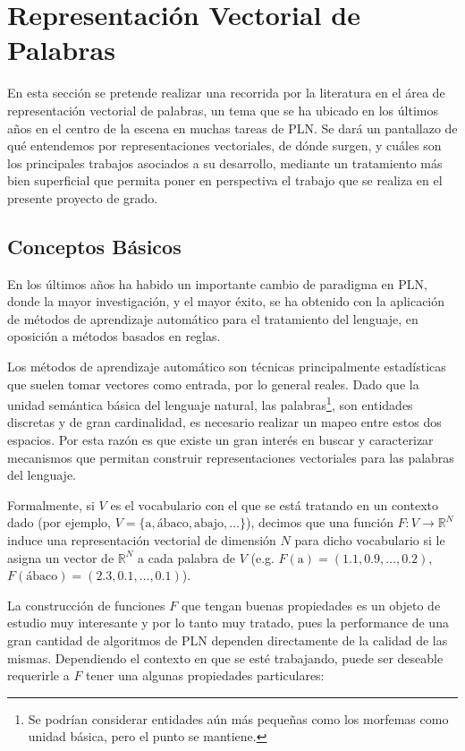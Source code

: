 \chapter{Representación Vectorial de Palabras}

En esta sección se pretende realizar una recorrida por la literatura en el área de representación
vectorial de palabras, un tema que se ha ubicado en los últimos años en el centro de la escena en
muchas tareas de PLN\@. Se dará un pantallazo de qué entendemos por representaciones vectoriales, de
dónde surgen, y cuáles son los principales trabajos asociados a su desarrollo, mediante un
tratamiento más bien superficial que permita poner en perspectiva el trabajo que se realiza en el
presente proyecto de grado.


\section{Conceptos Básicos}

En los últimos años ha habido un importante cambio de paradigma en PLN, donde la mayor
investigación, y el mayor éxito, se ha obtenido con la aplicación de métodos de aprendizaje
automático para el tratamiento del lenguaje, en oposición a métodos basados en reglas.

Los métodos de aprendizaje automático son técnicas principalmente estadísticas que suelen tomar
vectores como entrada, por lo general reales. Dado que la unidad semántica básica del lenguaje
natural, las palabras\footnote{Se podrían considerar entidades aún más pequeñas como los morfemas
como unidad básica, pero el punto se mantiene.}, son entidades discretas y de gran cardinalidad, es
necesario realizar un mapeo entre estos dos espacios. Por esta razón es que existe un gran interés
en buscar y caracterizar mecanismos que permitan construir representaciones vectoriales para las
palabras del lenguaje.

Formalmente, si $V$ es el vocabulario con el que se está tratando en un contexto dado (por ejemplo,
$V = \{ \text{a}, \text{ábaco}, \text{abajo}, \ldots \}$), decimos que una función $F: V \to
\mathbb{R}^N$ induce una representación vectorial de dimensión $N$ para dicho vocabulario si le
asigna un vector de $\mathbb{R}^N$ a cada palabra de $V$ (e.g. $F(\text{a}) = (1.1, 0.9, \ldots,
0.2)$, $F(\text{ábaco}) = (2.3, 0.1, \ldots, 0.1)$).


La construcción de funciones $F$ que tengan buenas propiedades es un objeto de estudio muy
interesante y por lo tanto muy tratado, pues la performance de una gran cantidad de algoritmos de
PLN dependen directamente de la calidad de las mismas. Dependiendo el contexto en que se esté
trabajando, puede ser deseable requerirle a $F$ tener una algunas propiedades particulares:

